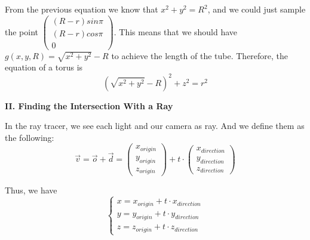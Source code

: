 \documentclass[a4paper,12pt]{report}
\begin{document}
From the previous equation we know that $x^2 +y^2 = R^2$, and we could just sample the point 
$\begin{pmatrix}
(R-r)sin\pi\\
(R-r)cos\pi\\
0
\end{pmatrix}$. This means that we should have $g(x,y,R)=\sqrt{x^2+y^2}-R$ to achieve the length of the tube. Therefore, the equation of a torus is
\begin{equation}
(\sqrt{x^2+y^2}-R)^2+z^2=r^2
\end{equation}

\noindent
\textbf{II. Finding the Intersection With a Ray}

In the ray tracer, we see each light and our camera as ray. And we define them as the following:
\begin{equation}
\overrightarrow{v} = 
\overrightarrow{o}+\overrightarrow{d}
=
\begin{pmatrix}
x_{origin}\\
y_{origin}\\
z_{origin}
\end{pmatrix} + t \cdot{
\begin{pmatrix}
x_{direction}\\
y_{direction}\\
z_{direction}
\end{pmatrix}}
\end{equation}

Thus, we have 
\begin{equation}
\begin{cases}
x=x_{origin}+t\cdot{x_{direction}}\\
y=y_{origin}+t\cdot{y_{direction}}\\
z=z_{origin}+t\cdot{z_{direction}}
\end{cases}
\end{equation}
\end{document}
